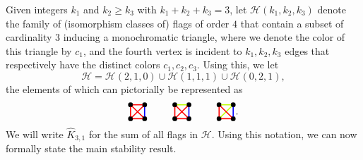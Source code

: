 \documentclass[a4paper,11pt]{article}
\numberwithin{equation}{section}
\newcommand{\mH}{\mathcal{H}}
\begin{document}
Given integers $k_1$ and $k_2\ge k_3$ with $k_1 + k_2 + k_3 = 3$, let $\mH(k_1,k_2,k_3)$ denote the family of (isomorphism classes of) flags of order $4$ that contain a subset of cardinality $3$ inducing a monochromatic triangle, where we denote the color of this triangle by $c_1$, and the fourth vertex is incident to $k_1,k_2,k_3$ edges that respectively have the distinct colors $c_1,c_2,c_3$. Using this, we let
\[
    \mH =
    \mH(2,1,0)\cup \mH(1,1,1)\cup \mH(0,2,1),
\]
the elements of which can pictorially be represented as
\[
        \begin{tikzpicture}[line width=0.4mm, baseline=1ex,
        scale = 0.5]
            \node[circle,fill=black,draw,scale=0.4] (A) at (0,0) {};
            \node[circle,fill=black,draw, scale=0.4] (B) at (1,0) {};
            \node[circle,fill=black,draw, scale=0.4] (C) at (1,1) {};
            \node[circle,fill=black,draw, scale=0.4] (D) at (0,1) {};
            \draw[red] (A) -- (B);
            \draw[red] (A) -- (C);
            \draw[red] (A) -- (D);
            \draw[blue] (B) -- (C);
            \draw[red] (B) -- (D);
            \draw[red] (C) -- (D);
        \end{tikzpicture}
    \hspace{9mm} 
    \begin{tikzpicture}[line width=0.4mm, baseline=1ex,
        scale = 0.5]
        \node[circle,fill=black,draw,scale=0.4] (A) at (0,0) {};
        \node[circle,fill=black,draw, scale=0.4] (B) at (1,0) {};
        \node[circle,fill=black,draw, scale=0.4] (C) at (1,1) {};
        \node[circle,fill=black,draw, scale=0.4] (D) at (0,1) {};
        \draw[red] (A) -- (B);
        \draw[red] (A) -- (C);
        \draw[red] (A) -- (D);
        \draw[blue] (B) -- (C);
        \draw[red] (B) -- (D);
        \draw[lime] (C) -- (D);
    \end{tikzpicture}
    \hspace{9mm} 
    \begin{tikzpicture}[line width=0.4mm, baseline=1ex,
        scale = 0.5]
        \node[circle,fill=black,draw,scale=0.4] (A) at (0,0) {};
        \node[circle,fill=black,draw, scale=0.4] (B) at (1,0) {};
        \node[circle,fill=black,draw, scale=0.4] (C) at (1,1) {};
        \node[circle,fill=black,draw, scale=0.4] (D) at (0,1) {};
        \draw[red] (A) -- (B);
        \draw[lime] (A) -- (C);
        \draw[red] (A) -- (D);
        \draw[blue] (B) -- (C);
        \draw[red] (B) -- (D);
        \draw[lime] (C) -- (D);
    \end{tikzpicture}.
    \]
    We will write $\hat K_{3,1}$ for the sum of all flags in $\mH$. 
    Using this notation, we can now formally state the main stability result.
    
\end{document}
